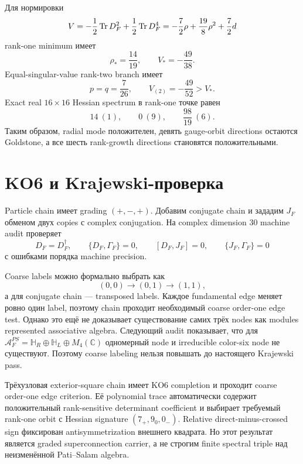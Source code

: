 Для нормировки
\begin{equation}
 V=-\frac12\operatorname{Tr} D_F^2+\frac12\operatorname{Tr} D_F^4
 =-\frac72\rho+\frac{19}{8}\rho^2+\frac72d
 \label{eq:ps-three-node-potential}
\end{equation}
rank-one minimum имеет
\begin{equation}
 \rho_*=\frac{14}{19},
 \qquad
 V_*=-\frac{49}{38}.
\end{equation}
Equal-singular-value rank-two branch имеет
\begin{equation}
 p=q=\frac7{26},
 \qquad
 V_{(2)}=-\frac{49}{52}>V_*.
\end{equation}
Exact real \(16\times16\) Hessian spectrum в rank-one точке равен
\begin{equation}
 \boxed{
 14\ (1),\qquad
 0\ (9),\qquad
 \frac{98}{19}\ (6).}
 \label{eq:ps-three-node-hessian}
\end{equation}
Таким образом, radial mode положителен, девять gauge-orbit directions
остаются Goldstone, а все шесть rank-growth directions становятся
положительными.

\section{KO6 и Krajewski-проверка}

Particle chain имеет grading \((+,-,+)\). Добавим conjugate chain и зададим
\(J_F\) обменом двух copies с complex conjugation. На complex dimension 30
machine audit проверяет
\begin{equation}
 D_F=D_F^\dagger,\qquad
 \{D_F,\Gamma_F\}=0,\qquad
 [D_F,J_F]=0,\qquad
 \{J_F,\Gamma_F\}=0
\end{equation}
с ошибками порядка machine precision.

Coarse labels можно формально выбрать как
\begin{equation}
 (0,0)\longrightarrow(0,1)\longrightarrow(1,1),
\end{equation}
а для conjugate chain --- transposed labels. Каждое fundamental edge меняет
ровно один label, поэтому chain проходит необходимый coarse order-one edge
test. Однако это ещё не доказывает существование самих трёх nodes как
modules represented associative algebra. Следующий audit показывает, что
для \(\mathcal A_F^{PS}=\mathbb H_R\oplus\mathbb H_L\oplus M_4(\mathbb C)\)
одномерный node и irreducible color-six node не существуют. Поэтому coarse
labeling нельзя повышать до настоящего Krajewski pass.

\begin{theorem}
Трёхузловая exterior-square chain имеет KO6 completion и проходит coarse
order-one edge criterion. Её polynomial trace автоматически содержит
положительный rank-sensitive determinant coefficient и выбирает требуемый
rank-one orbit с Hessian signature \((7_+,9_0,0_-)\). Relative
direct-minus-crossed sign фиксирован antisymmetrization внешнего квадрата.
Но этот результат является graded superconnection carrier, а не строгим
finite spectral triple над неизменённой Pati--Salam algebra.
\end{theorem}

